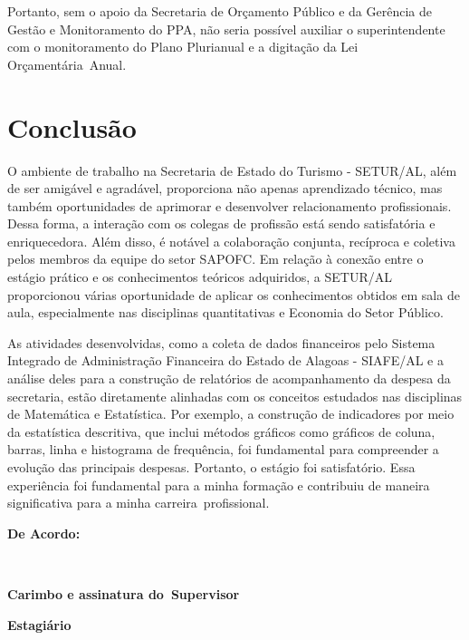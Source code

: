 \documentclass[12pt,a4paper]{article}
\begin{document}
	Portanto, sem o apoio da Secretaria de Orçamento Público e da Gerência de Gestão e Monitoramento do PPA, não seria possível auxiliar o superintendente com o monitoramento do Plano Plurianual e a digitação da Lei Orçamentária Anual.

	\section{Conclusão}
	\hspace*{1,5cm} 
	O ambiente de trabalho na Secretaria de Estado do Turismo - SETUR/AL, além de ser amigável e agradável, proporciona não apenas aprendizado técnico, mas também oportunidades de aprimorar e desenvolver relacionamento profissionais. Dessa forma, a interação com os colegas de profissão está sendo satisfatória e enriquecedora. Além disso, é notável a colaboração conjunta, recíproca e coletiva pelos membros da equipe do setor SAPOFC. Em relação à conexão entre o estágio prático e os conhecimentos teóricos adquiridos, a SETUR/AL proporcionou várias oportunidade de aplicar os conhecimentos obtidos em sala de aula, especialmente nas disciplinas quantitativas e  Economia do Setor Público. 
	
	As atividades desenvolvidas, como a coleta de dados financeiros pelo Sistema Integrado de Administração Financeira do Estado de Alagoas - SIAFE/AL e a análise deles para a construção de relatórios de acompanhamento da despesa da secretaria, estão diretamente alinhadas com os conceitos estudados nas disciplinas de Matemática e Estatística. Por exemplo, a construção de indicadores por meio da estatística descritiva, que inclui métodos gráficos como gráficos de coluna, barras, linha e histograma de frequência, foi fundamental para compreender a evolução das principais despesas. Portanto, o estágio foi satisfatório. Essa experiência foi fundamental para a minha formação e contribuiu de maneira significativa para a minha carreira profissional.

	

	
	\newpage
	\vspace{2cm}
	\noindent \textbf{De Acordo:}
	
	\vfill

	\noindent
	\underline{\hspace{7cm}} \hfill \underline{\hspace{7cm}} \\[0.3cm]

	\begin{minipage}[t]{7cm}
		\centering
		\textbf{Carimbo e assinatura do\
		Supervisor}
	\end{minipage}
		\hfill
	\begin{minipage}[t]{7cm}
		\centering
		\textbf{Estagiário}
	\end{minipage}

	
\end{document}
